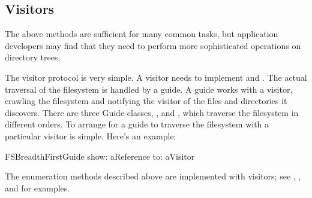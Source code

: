 \documentclass[a4paper,10pt,twoside]{book}
\begin{document}
\subsection{Visitors}

The above methods are sufficient for many common tasks, but application developers may find that they need to perform more sophisticated operations on directory trees.

The visitor protocol is very simple. A visitor needs to implement  and . The actual traversal of the filesystem is handled by a guide. A guide works with a visitor, crawling the filesystem and notifying the visitor of the files and directories it discovers. There are three Guide classes, ,  and  , which traverse the filesystem in different orders. To arrange for a guide to traverse the filesystem with a particular visitor is simple. Here's an example:

\begin{code}{}
    FSBreadthFirstGuide show: aReference to: aVisitor
\end{code}	

The enumeration methods described above are implemented with visitors; see , , and  for examples.



\ifx\wholebook\relax\else
   
   
\end{document}
